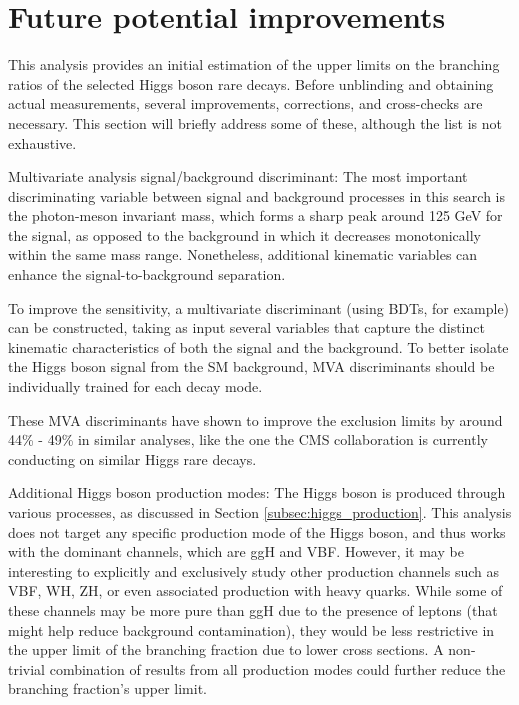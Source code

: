 \section{Future potential improvements}\label{sec:future_improvements}

This analysis provides an initial estimation of the upper limits on the branching ratios of the selected Higgs boson rare decays. Before unblinding and obtaining actual measurements, several improvements, corrections, and cross-checks are necessary. This section will briefly address some of these, although the list is not exhaustive.
\vspace*{-6pt}
\begin{myitemlist}
    \item[Multivariate analysis signal/background discriminant:] The most important discriminating variable between signal and background processes in this search is the photon-meson invariant mass, which forms a sharp peak around 125 GeV for the signal, as opposed to the background in which it decreases monotonically within the same mass range. Nonetheless, additional kinematic variables can enhance the signal-to-background separation.
    
    To improve the sensitivity, a multivariate discriminant (using BDTs, for example) can be constructed, taking as input several variables that capture the distinct kinematic characteristics of both the signal and the background. To better isolate the Higgs boson signal from the SM background, MVA discriminants should be individually trained for each decay mode.

    These MVA discriminants have shown to improve the exclusion limits by around 44\% - 49\% in similar analyses, like the one the CMS collaboration is currently conducting on similar Higgs rare decays.

    \item[Additional Higgs boson production modes:] The Higgs boson is produced through various processes, as discussed in Section \ref{subsec:higgs_production}. This analysis does not target any specific production mode of the Higgs boson, and thus works with the dominant channels, which are ggH and VBF. However, it may be interesting to explicitly and exclusively study other production channels such as VBF, WH, ZH, or even associated production with heavy quarks. While some of these channels may be more pure than ggH due to the presence of leptons (that might help reduce background contamination), they would be less restrictive in the upper limit of the branching fraction due to lower cross sections. A non-trivial combination of results from all production modes could further reduce the branching fraction's upper limit.
    

\end{myitemlist}
